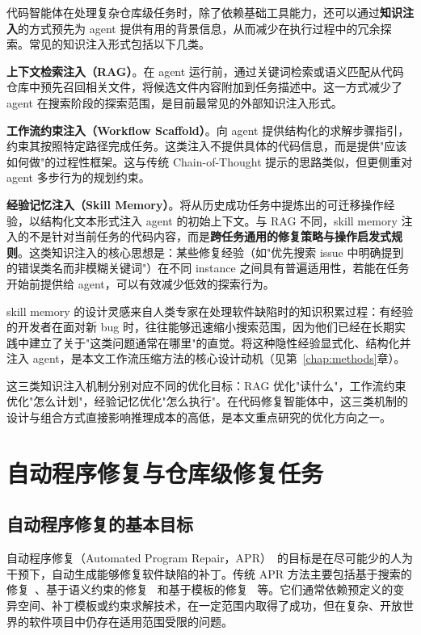 代码智能体在处理复杂仓库级任务时，除了依赖基础工具能力，还可以通过\textbf{知识注入}的方式预先为 agent 提供有用的背景信息，从而减少在执行过程中的冗余探索。常见的知识注入形式包括以下几类。

\textbf{上下文检索注入（RAG）}。在 agent 运行前，通过关键词检索或语义匹配从代码仓库中预先召回相关文件，将候选文件内容附加到任务描述中。这一方式减少了 agent 在搜索阶段的探索范围，是目前最常见的外部知识注入形式。

\textbf{工作流约束注入（Workflow Scaffold）}。向 agent 提供结构化的求解步骤指引，约束其按照特定路径完成任务。这类注入不提供具体的代码信息，而是提供"应该如何做"的过程性框架。这与传统 Chain-of-Thought 提示的思路类似，但更侧重对 agent 多步行为的规划约束。

\textbf{经验记忆注入（Skill Memory）}。将从历史成功任务中提炼出的可迁移操作经验，以结构化文本形式注入 agent 的初始上下文。与 RAG 不同，skill memory 注入的不是针对当前任务的代码内容，而是\textbf{跨任务通用的修复策略与操作启发式规则}。这类知识注入的核心思想是：某些修复经验（如"优先搜索 issue 中明确提到的错误类名而非模糊关键词"）在不同 instance 之间具有普遍适用性，若能在任务开始前提供给 agent，可以有效减少低效的探索行为。

skill memory 的设计灵感来自人类专家在处理软件缺陷时的知识积累过程：有经验的开发者在面对新 bug 时，往往能够迅速缩小搜索范围，因为他们已经在长期实践中建立了关于"这类问题通常在哪里"的直觉。将这种隐性经验显式化、结构化并注入 agent，是本文工作流压缩方法的核心设计动机（见第~\ref{chap:methods}章）。

这三类知识注入机制分别对应不同的优化目标：RAG 优化"读什么"，工作流约束优化"怎么计划"，经验记忆优化"怎么执行"。在代码修复智能体中，这三类机制的设计与组合方式直接影响推理成本的高低，是本文重点研究的优化方向之一。


\section{自动程序修复与仓库级修复任务}

\subsection{自动程序修复的基本目标}

自动程序修复（Automated Program Repair，APR）~\cite{le2021automatic}的目标是在尽可能少的人为干预下，自动生成能够修复软件缺陷的补丁。传统 APR 方法主要包括基于搜索的修复~\cite{le2011genprog}、基于语义约束的修复~\cite{nguyen2013semfix} 和基于模板的修复~\cite{liu2019tbar} 等。它们通常依赖预定义的变异空间、补丁模板或约束求解技术，在一定范围内取得了成功，但在复杂、开放世界的软件项目中仍存在适用范围受限的问题。

